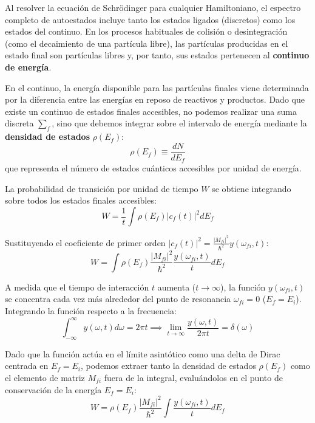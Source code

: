 Al resolver la ecuación de Schrödinger para cualquier Hamiltoniano, el espectro completo de autoestados incluye tanto los estados ligados (discretos) como los estados del continuo. En los procesos habituales de colisión o desintegración (como el decaimiento de una partícula libre), las partículas producidas en el estado final son partículas libres y, por tanto, sus estados pertenecen al \textbf{continuo de energía}.

En el continuo, la energía disponible para las partículas finales viene determinada por la diferencia entre las energías en reposo de reactivos y productos. Dado que existe un continuo de estados finales accesibles, no podemos realizar una suma discreta $\sum_f$, sino que debemos integrar sobre el intervalo de energía mediante la \textbf{densidad de estados} $\rho(E_f)$:
\begin{equation}
\rho(E_f) \equiv \frac{dN}{dE_f}
\end{equation}
que representa el número de estados cuánticos accesibles por unidad de energía.

La probabilidad de transición por unidad de tiempo $W$ se obtiene integrando sobre todos los estados finales accesibles:
\begin{equation}
W = \frac{1}{t} \int \rho(E_f) |c_f(t)|^2 dE_f
\end{equation}

Sustituyendo el coeficiente de primer orden $|c_f(t)|^2 = \frac{|M_{fi}|^2}{\hbar^2} y(\omega_{fi}, t)$:
\begin{equation}
W = \int \rho(E_f) \frac{|M_{fi}|^2}{\hbar^2} \frac{y(\omega_{fi}, t)}{t} dE_f
\end{equation}

A medida que el tiempo de interacción $t$ aumenta ($t \to \infty$), la función $y(\omega_{fi}, t)$ se concentra cada vez más alrededor del punto de resonancia $\omega_{fi} = 0$ ($E_f = E_i$). Integrando la función respecto a la frecuencia:
\begin{equation}
\int_{-\infty}^{\infty} y(\omega, t) d\omega = 2\pi t \implies \lim_{t \to \infty} \frac{y(\omega, t)}{2\pi t} = \delta(\omega)
\end{equation}

Dado que la función actúa en el límite asintótico como una delta de Dirac centrada en $E_f = E_i$, podemos extraer tanto la densidad de estados $\rho(E_f)$ como el elemento de matriz $M_{fi}$ fuera de la integral, evaluándolos en el punto de conservación de la energía $E_f = E_i$:
\begin{equation}
W = \rho(E_f) \frac{|M_{fi}|^2}{\hbar^2} \int \frac{y(\omega_{fi}, t)}{t} dE_f
\end{equation}


